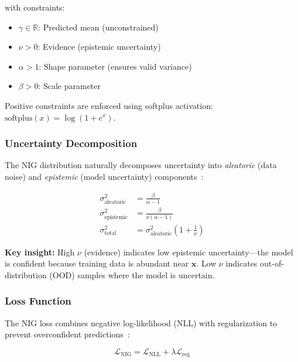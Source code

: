 \noindent with constraints:
\begin{itemize}[nosep]
    \item $\gamma \in \mathbb{R}$: Predicted mean (unconstrained)
    \item $\nu > 0$: Evidence (epistemic uncertainty)
    \item $\alpha > 1$: Shape parameter (ensures valid variance)
    \item $\beta > 0$: Scale parameter
\end{itemize}

Positive constraints are enforced using softplus activation: $\text{softplus}(x) = \log(1 + e^x)$.

\subsubsection{Uncertainty Decomposition}

The NIG distribution naturally decomposes uncertainty into \textit{aleatoric} (data noise) and \textit{epistemic} (model uncertainty) components~\citep{josang2016subjective}:

\begin{align}
    \sigma^2_{\text{aleatoric}} &= \frac{\beta}{\alpha - 1} \label{eq:aleatoric_var} \\
    \sigma^2_{\text{epistemic}} &= \frac{\beta}{\nu(\alpha - 1)} \label{eq:epistemic_var} \\
    \sigma^2_{\text{total}} &= \sigma^2_{\text{aleatoric}} \left(1 + \frac{1}{\nu}\right) \label{eq:total_var}
\end{align}

\textbf{Key insight:} High $\nu$ (evidence) indicates low epistemic uncertainty---the model is confident because training data is abundant near $\mathbf{x}$. Low $\nu$ indicates out-of-distribution (OOD) samples where the model is uncertain.

\subsubsection{Loss Function}

The NIG loss combines negative log-likelihood (NLL) with regularization to prevent overconfident predictions~\citep{amini2020deep}:

\begin{equation}
    \mathcal{L}_{\text{NIG}} = \mathcal{L}_{\text{NLL}} + \lambda \mathcal{L}_{\text{reg}}
    \label{eq:nig_loss_total}
\end{equation}

